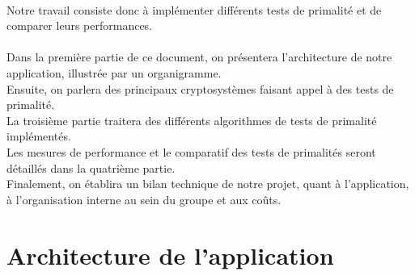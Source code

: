 	\paragraph{}Notre travail consiste donc à implémenter différents tests de primalité et de comparer leurs performances.
	\paragraph{}Dans la première partie de ce document, on présentera l'architecture de notre application, illustrée par un organigramme.\\
	Ensuite, on parlera des principaux cryptosystèmes faisant appel à des tests de primalité. \\
	La troisième partie traitera des différents algorithmes de tests de primalité implémentés.\\
	Les mesures de performance et le comparatif des tests de primalités seront détaillés dans la quatrième partie.\\
	Finalement, on établira un bilan technique de notre projet, quant à l'application, à l'organisation interne au sein du groupe et aux coûts.
	
	\section{Architecture de l'application}
